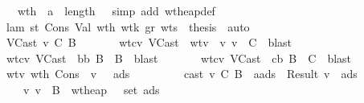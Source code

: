 \begin{isabellebody}
\ \ \ \ \ \ \ \ \isamarkupfalse \ wt{\isacharunderscore}h\ \isamarkupfalse \ {\isachardoublequoteopen}a\ {\isacharless}\ length\ {\isasymmu}{\isachardoublequoteclose}\ \isamarkupfalse \ {\isacharparenleft}simp\ add{\isacharcolon}\ wt{\isacharunderscore}heap{\isacharunderscore}def{\isacharparenright}\ \isanewline
\ \ \ \ \ \ \isamarkupfalse \isanewline
\ \ \ \ \ \ \isamarkupfalse \ lam\ st\ Cons\ Val\ wth{}\ wt{\isacharunderscore}k\ gr\ wts\ \isamarkupfalse \ {\isacharquery}thesis\ \isamarkupfalse \ auto\isanewline
\ \ \ \ \isamarkupfalse \isanewline
\ \ \ \ \ \ \isamarkupfalse \ {\isacharparenleft}VCast\ v\ C\ B{\isacharprime}{\isacharparenright}\isanewline
\ \ \ \ \ \ \isamarkupfalse \ wtcv\ VCast\ \isamarkupfalse \ wtv{\isacharcolon}\ {\isachardoublequoteopen}{\isasymSigma}\ {\isasymturnstile}v\ v\ {\isacharcolon}\ C{\isachardoublequoteclose}\ \isamarkupfalse \ blast\ \isamarkupfalse \isanewline
\ \ \ \ \ \ \isamarkupfalse \ wtcv\ VCast\ \isamarkupfalse \ bb{\isacharcolon}\ {\isachardoublequoteopen}B{\isacharprime}\ {\isacharequal}\ B{\isachardoublequoteclose}\ \isamarkupfalse \ blast\isanewline
\ \ \ \ \ \ \isamarkupfalse \ wtcv\ VCast\ \isamarkupfalse \ cb{\isacharcolon}\ {\isachardoublequoteopen}B\ {\isasymsqsubseteq}\ C{\isachardoublequoteclose}\ \isamarkupfalse \ blast\isanewline
\ \ \ \ \ \ \isamarkupfalse \ wtv\ wt{\isacharunderscore}h\ Cons\ \isamarkupfalse \ {\isachardoublequoteopen}{\isacharparenleft}{\isasymexists}v{\isacharprime}\ {\isasymSigma}{\isacharprime}\ {\isasymmu}{\isacharprime}\ ads{}{\isachardot}\isanewline
\ \ \ \ \ \ \ \ \ cast\ v\ C\ B{\isacharprime}\ {\isasymmu}\ {\isacharparenleft}a{\isacharhash}ads{\isacharprime}{\isacharparenright}\ {\isacharequal}\ Result\ {\isacharparenleft}v{\isacharprime}{\isacharcomma}\ {\isasymmu}{\isacharprime}{\isacharcomma}\ ads{}{\isacharparenright}\ {\isasymand}\isanewline
\ \ \ \ \ \ \ \ \ {\isasymSigma}{\isacharprime}\ {\isasymturnstile}v\ v{\isacharprime}\ {\isacharcolon}\ B{\isacharprime}\ {\isasymand}\ wt{\isacharunderscore}heap\ {\isasymSigma}{\isacharprime}\ {\isasymmu}{\isacharprime}\ {\isacharparenleft}set\ ads{}{\isacharparenright}\ {\isasymand}\ {\isasymSigma}{\isacharprime}\ {\isasymsqsubseteq}\ {\isasymSigma}{\isacharparenright}\ {\isasymor}\isanewline

\end{isabellebody}
